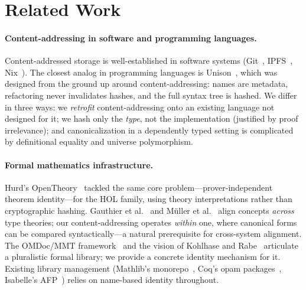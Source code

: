 \section{Related Work}
\label{sec:related}

\paragraph{Content-addressing in software and programming languages.}
Content-addressed storage is well-established in software systems
(Git~\cite{git}, IPFS~\cite{benet2014ipfs},
Nix~\cite{dolstra2004nix}).  The closest analog in programming
languages is Unison~\cite{unison}, which was designed from the ground
up around content-addressing: names are metadata, refactoring never
invalidates hashes, and the full syntax tree is hashed.  We differ in
three ways: we \emph{retrofit} content-addressing onto an existing
language not designed for it; we hash only the \emph{type}, not the
implementation (justified by proof irrelevance); and canonicalization
in a dependently typed setting is complicated by definitional equality
and universe polymorphism.

\paragraph{Formal mathematics infrastructure.}
Hurd's OpenTheory~\cite{hurd2011opentheory} tackled the same core
problem---prover-independent theorem identity---for the HOL family,
using theory interpretations rather than cryptographic hashing.
Gauthier et al.~\cite{gauthier2019aligning} and M\"uller et
al.~\cite{muller2017alignment} align concepts \emph{across} type
theories; our content-addressing operates \emph{within} one, where
canonical forms can be compared syntactically---a natural prerequisite
for cross-system alignment.
  The OMDoc/MMT
framework~\cite{rabe2013scalable, kohlhase2006omdoc} and the vision of
Kohlhase and Rabe~\cite{kohlhase2017qed} articulate a pluralistic
formal library; we provide a concrete identity mechanism for it.
Existing library management (Mathlib's monorepo~\cite{mathlib4}, Coq's
opam packages~\cite{coq}, Isabelle's AFP~\cite{isabelle_afp}) relies
on name-based identity throughout.

